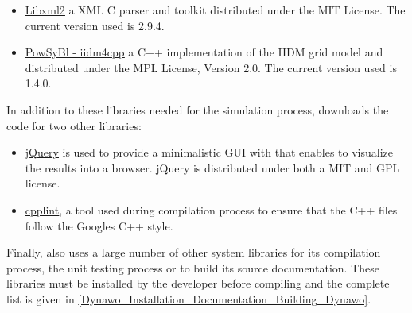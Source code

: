 \documentclass[a4paper, 12pt]{report}
\begin{document}
\begin{itemize}
\item \href{http://xmlsoft.org/}{\underline{Libxml2}} a XML C parser and toolkit distributed under the MIT License. The current version used is 2.9.4.

\item \href{https://www.powsybl.org/pages/documentation/developer/repositories/powsybl-iidm4cpp.html}{\underline{PowSyBl - iidm4cpp}} a C++ implementation of the IIDM grid model and distributed under the MPL License, Version 2.0. The current version used is 1.4.0.

\end{itemize}

In addition to these libraries needed for the simulation process, \Dynawo downloads the code for two other libraries:
\begin{itemize}
\item \href{https://jquery.com/}{\underline{jQuery}} is used to provide a minimalistic GUI with \Dynawo that enables to visualize the results into a browser. jQuery is distributed under both a MIT and GPL license.
\item \href{https://github.com/google/styleguide/tree/gh-pages/cpplint}{\underline{cpplint}}, a tool used during \Dynawo compilation process to ensure that the C++ files follow the Google\textquotesingle s C++ style.
\end{itemize}

Finally, \Dynawo also uses a large number of other system libraries for its compilation process, the unit testing process or to build its source documentation. These libraries must be installed by the developer before compiling \Dynawo and the complete list is given in \ref{Dynawo_Installation_Documentation_Building_Dynawo}.



\end{document}
